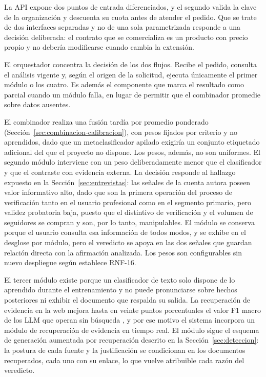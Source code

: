 La API expone dos puntos de entrada diferenciados, y el segundo valida la clave de la organización y descuenta su cuota antes de atender el pedido. Que se trate de dos interfaces separadas y no de una sola parametrizada responde a una decisión deliberada: el contrato que se comercializa es un producto con precio propio y no debería modificarse cuando cambia la extensión.

El orquestador concentra la decisión de los dos flujos. Recibe el pedido, consulta el análisis vigente y, según el origen de la solicitud, ejecuta únicamente el primer módulo o los cuatro. Es además el componente que marca el resultado como parcial cuando un módulo falla, en lugar de permitir que el combinador promedie sobre datos ausentes.

El combinador realiza una fusión tardía por promedio ponderado (Sección~\ref{sec:combinacion-calibracion}), con pesos fijados por criterio y no aprendidos, dado que un metaclasificador apilado exigiría un conjunto etiquetado adicional del que el proyecto no dispone. Los pesos, además, no son uniformes. El segundo módulo interviene con un peso deliberadamente menor que el clasificador y que el contraste con evidencia externa. La decisión responde al hallazgo expuesto en la Sección~\ref{sec:entrevistas}: las señales de la cuenta autora poseen valor informativo alto, dado que son la primera operación del proceso de verificación tanto en el usuario profesional como en el segmento primario, pero validez probatoria baja, puesto que el distintivo de verificación y el volumen de seguidores se compran y son, por lo tanto, manipulables. El módulo se conserva porque el usuario consulta esa información de todos modos, y se exhibe en el desglose por módulo, pero el veredicto se apoya en las dos señales que guardan relación directa con la afirmación analizada. Los pesos son configurables sin nuevo despliegue según establece RNF-16.

El tercer módulo existe porque un clasificador de texto solo dispone de lo aprendido durante el entrenamiento y no puede pronunciarse sobre hechos posteriores ni exhibir el documento que respalda su salida. La recuperación de evidencia en la web mejora hasta en veinte puntos porcentuales el valor F1 macro de los LLM que operan sin búsqueda \parencite{TianEtAl2024}, y por ese motivo el sistema incorpora un módulo de recuperación de evidencia en tiempo real. El módulo sigue el esquema de generación aumentada por recuperación descrito en la Sección~\ref{sec:deteccion}: la postura de cada fuente y la justificación se condicionan en los documentos recuperados, cada uno con su enlace, lo que vuelve atribuible cada razón del veredicto.

